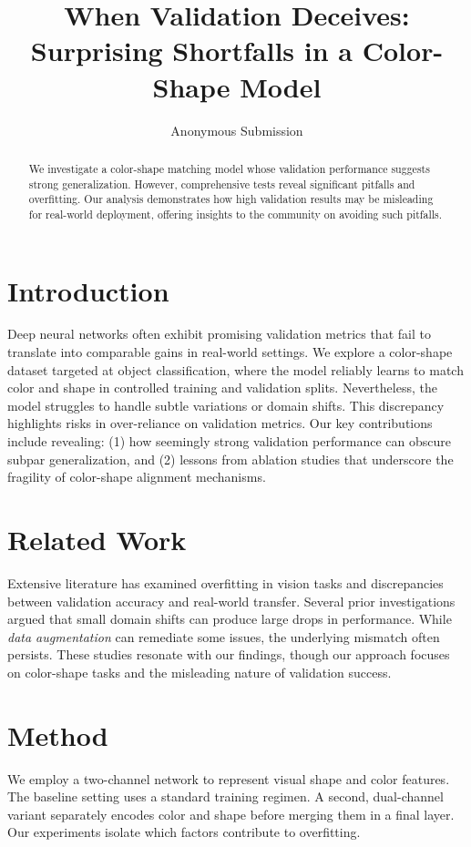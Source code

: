\documentclass{article}
\begin{document}
\title{When Validation Deceives: Surprising Shortfalls in a Color-Shape Model}
\author{Anonymous Submission}
\date{}
\maketitle

\begin{abstract}
We investigate a color-shape matching model whose validation performance suggests strong generalization. However, comprehensive tests reveal significant pitfalls and overfitting. Our analysis demonstrates how high validation results may be misleading for real-world deployment, offering insights to the community on avoiding such pitfalls.
\end{abstract}

\section{Introduction}
Deep neural networks often exhibit promising validation metrics that fail to translate into comparable gains in real-world settings. We explore a color-shape dataset targeted at object classification, where the model reliably learns to match color and shape in controlled training and validation splits. Nevertheless, the model struggles to handle subtle variations or domain shifts. This discrepancy highlights risks in over-reliance on validation metrics. Our key contributions include revealing:
(1) how seemingly strong validation performance can obscure subpar generalization, and (2) lessons from ablation studies that underscore the fragility of color-shape alignment mechanisms.

\section{Related Work}
Extensive literature has examined overfitting in vision tasks and discrepancies between validation accuracy and real-world transfer. Several prior investigations argued that small domain shifts can produce large drops in performance. While \emph{data augmentation} can remediate some issues, the underlying mismatch often persists. These studies resonate with our findings, though our approach focuses on color-shape tasks and the misleading nature of validation success.

\section{Method}
We employ a two-channel network to represent visual shape and color features. The baseline setting uses a standard training regimen. A second, dual-channel variant separately encodes color and shape before merging them in a final layer. Our experiments isolate which factors contribute to overfitting.
\end{document}
